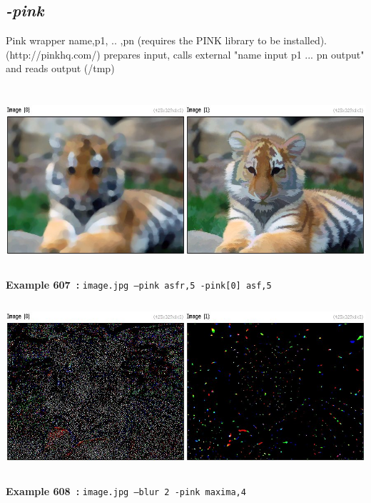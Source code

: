 \documentclass[a4paper,11pt,twoside]{book}
\begin{document}
\subsection{\emph{-pink} }\vspace*{-0.5em}
Pink wrapper name,p1, .. ,pn (requires the PINK library to be installed).
~\\(http://pinkhq.com/)
prepares input, calls external "name input p1 ... pn output" and reads output (/tmp)
\begin{center}\includegraphics[keepaspectratio=true,height=7cm,width=\textwidth]{img/gmic_def607.jpg}\\
{\footnotesize \textbf{Example 607~:} \texttt{image.jpg --pink asfr,5 -pink[0] asf,5}}
\\\includegraphics[keepaspectratio=true,height=7cm,width=\textwidth]{img/gmic_def608.jpg}\\
{\footnotesize \textbf{Example 608~:} \texttt{image.jpg --blur 2 -pink maxima,4}}
\end{center}
\end{document}
